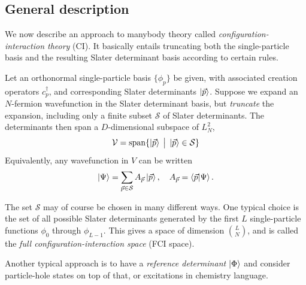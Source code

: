 \documentclass{report}
\theoremstyle{plain}
\theoremstyle{definition}
\begin{document}
\subsection{General description}


We now describe an approach to manybody theory called
\emph{configuration-interaction theory} (CI). It basically entails
truncating both the single-particle basis and the resulting Slater
determinant basis according to certain rules.

Let an orthonormal single-particle basis $\{\phi_p\}$ be given, with associated
creation operators $c^\dag_p$, and corresponding Slater determinants
$\ket{\vec{p}}$. Suppose we expand an $N$-fermion wavefunction in
the Slater determinant basis, but \emph{truncate} the expansion, including only a finite
subset $\mathcal{S}$ of Slater determinants. The determinants then span a
$D$-dimensional subspace of $L^2_N$,
\begin{equation}
  \mathcal{V} = \operatorname{span} \{ \ket{\vec{p}} \; \big| \; \ket{\vec{p}} \in
  \mathcal{S} \}
\end{equation}
Equivalently, any wavefunction in $V$ can be written
\begin{equation}
  \ket{\Psi} = \sum_{\vec{p}\in\mathcal{S}} A_{\vec{p}} \ket{\vec{p}},
  \quad A_{\vec{p}} = \braket{\vec{p}|\Psi}.
\end{equation}




The set $\mathcal{S}$ may of course be chosen in many different
ways. One typical choice is the set of all possible Slater
determinants generated by the first $L$ single-particle functions
$\phi_0$ through $\phi_{L-1}$. This gives a space of dimension
$\binom{L}{N}$, and is called the \emph{full configuration-interaction
  space} (FCI space).

Another typical approach is to have a \emph{reference determinant}
$\ket{\Phi}$ and consider particle-hole states on top of that, or
excitations in chemistry language.
\end{document}
